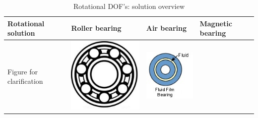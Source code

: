 \begin{table}[h] \centering \caption{Rotational DOF's: solution overview} \label{tab:rotationsolutions}
\begin{tabular}{p{4cm}|p{4cm}p{4cm}p{4cm}}
Rotational solution         & Roller bearing \cite{123RFBall54180420.} & Air bearing \cite{NELSONAIRAirAir} & Magnetic bearing \cite{magneticbearing} \\ \hline
Figure for clarification    & 
    \begin{minipage}{4cm}
      \includegraphics[width=\linewidth]{images/Ball_bearing2.jpg}
    \end{minipage} 
    &     
    \begin{minipage}{4cm}
      \includegraphics[width=\linewidth]{images/airbearing.jpg}

\end{minipage}
\end{tabular}
\end{table}
